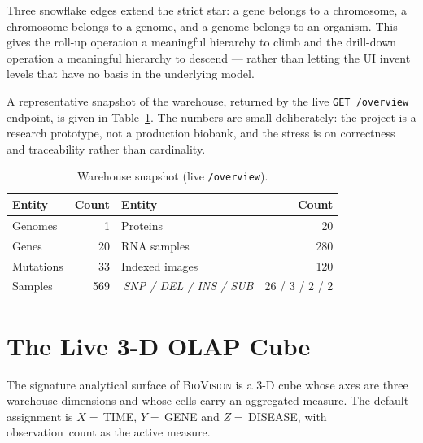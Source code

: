 \documentclass[conference,10pt]{IEEEtran}
\begin{document}
Three snowflake edges extend the strict star: a gene belongs to a
chromosome, a chromosome belongs to a genome, and a genome belongs to an
organism. This gives the roll-up operation a meaningful hierarchy to
climb and the drill-down operation a meaningful hierarchy to descend ---
rather than letting the UI invent levels that have no basis in the
underlying model.

A representative snapshot of the warehouse, returned by the live
\texttt{GET /overview} endpoint, is given in Table~\ref{tab:totals}.
The numbers are small deliberately: the project is a research prototype,
not a production biobank, and the stress is on correctness and
traceability rather than cardinality.

\begin{table}[t]
\centering
\caption{Warehouse snapshot (live \texttt{/overview}).}
\label{tab:totals}
\begin{tabular}{lrlr}
\toprule
\textbf{Entity} & \textbf{Count} & \textbf{Entity} & \textbf{Count}\\
\midrule
Genomes      &   1   & Proteins          &  20 \\
Genes        &  20   & RNA samples       & 280 \\
Mutations    &  33   & Indexed images    & 120 \\
Samples      & 569   & \,\textit{SNP / DEL / INS / SUB} & 26 / 3 / 2 / 2\\
\bottomrule
\end{tabular}
\end{table}

\section{The Live 3-D OLAP Cube}
The signature analytical surface of \textsc{BioVision} is a 3-D cube
whose axes are three warehouse dimensions and whose cells carry an
aggregated measure. The default assignment is \mbox{$X=$\,TIME},
\mbox{$Y=$\,GENE} and \mbox{$Z=$\,DISEASE}, with
\mbox{observation count} as the active measure.
\end{document}
